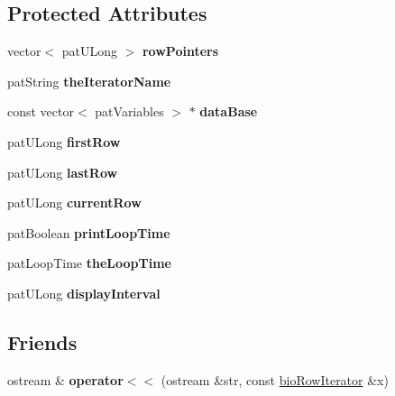\subsection*{Protected Attributes}
\begin{DoxyCompactItemize}
\item 
\mbox{\label{classbio_row_iterator_ab0f1d06f7b65680b5e24186919beeada}} 
vector$<$ pat\+U\+Long $>$ {\bfseries row\+Pointers}
\item 
\mbox{\label{classbio_row_iterator_a4fbaa8d1e9ba2309cc435865b2b1ac90}} 
pat\+String {\bfseries the\+Iterator\+Name}
\item 
\mbox{\label{classbio_row_iterator_a5af0091b737eafcdda8916e6f7079df4}} 
const vector$<$ pat\+Variables $>$ $\ast$ {\bfseries data\+Base}
\item 
\mbox{\label{classbio_row_iterator_a6225ca4c8558436b1ebdf5060f54afe1}} 
pat\+U\+Long {\bfseries first\+Row}
\item 
\mbox{\label{classbio_row_iterator_ad6211bb8ff699901f832bd8225e34762}} 
pat\+U\+Long {\bfseries last\+Row}
\item 
\mbox{\label{classbio_row_iterator_a2f8ea6bbd459285397d45fca49e39a42}} 
pat\+U\+Long {\bfseries current\+Row}
\item 
\mbox{\label{classbio_row_iterator_aaa7a365a80733d661c14e79f491ffee9}} 
pat\+Boolean {\bfseries print\+Loop\+Time}
\item 
\mbox{\label{classbio_row_iterator_af856fecfd5b26bd016b2391640cb3c4a}} 
pat\+Loop\+Time {\bfseries the\+Loop\+Time}
\item 
\mbox{\label{classbio_row_iterator_aacf3c229a146d72471303d8e78bf3037}} 
pat\+U\+Long {\bfseries display\+Interval}
\end{DoxyCompactItemize}
\subsection*{Friends}
\begin{DoxyCompactItemize}
\item 
\mbox{\label{classbio_row_iterator_aa60e8c8a13a436c680593ef4d42b4d63}} 
ostream \& {\bfseries operator$<$$<$} (ostream \&str, const \hyperlink{classbio_row_iterator}{bio\+Row\+Iterator} \&x)
\end{DoxyCompactItemize}


